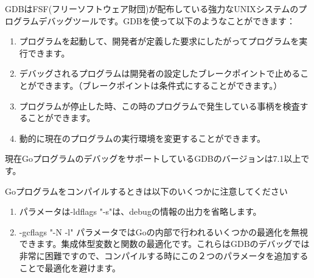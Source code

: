 GDBはFSF(フリーソフトウェア財団)が配布している強力なUNIXシステムのプログラムデバッグツールです。GDBを使って以下のようなことができます：

\begin{enumerate}
  \item プログラムを起動して、開発者が定義した要求にしたがってプログラムを実行できます。
  \item デバッグされるプログラムは開発者の設定したブレークポイントで止めることができます。（ブレークポイントは条件式にすることができます。）
  \item プログラムが停止した時、この時のプログラムで発生している事柄を検査することができます。
  \item 動的に現在のプログラムの実行環境を変更することができます。
\end{enumerate}

現在GoプログラムのデバッグをサポートしているGDBのバージョンは7.1以上です。

Goプログラムをコンパイルするときは以下のいくつかに注意してください

\begin{enumerate}
  \item パラメータは-ldflags "-s"は、debugの情報の出力を省略します。
  \item -gcflags "-N -l" パラメータではGoの内部で行われるいくつかの最適化を無視できます。集成体型変数と関数の最適化です。これらはGDBのデバッグでは非常に困難ですので、コンパイルする時にこの２つのパラメータを追加することで最適化を避けます。
\end{enumerate}

